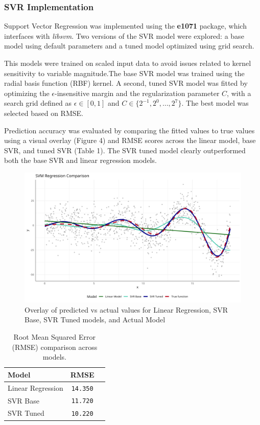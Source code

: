 \documentclass[8pt,twocolumn]{article}
\begin{document}
\subsubsection{SVR Implementation}
Support Vector Regression was implemented using the \textbf{e1071} package, which interfaces with \textit{libsvm}. Two versions of the SVR model were explored: a base model using default parameters and a tuned model optimized using grid search.

This models were trained on scaled input data to avoid issues related to kernel sensitivity to variable magnitude.The base SVR model was trained using the radial basis function (RBF) kernel. A second, tuned SVR model was fitted by optimizing the $\epsilon$-insensitive margin and the regularization parameter $C$, with a search grid defined as $\epsilon \in [0, 1]$ and $C \in \{2^{-1}, 2^0, \dots, 2^7\}$. The best model was selected based on RMSE. 

Prediction accuracy was evaluated by comparing the fitted values to true values using a visual overlay (Figure 4) and RMSE scores across the linear model, base SVR, and tuned SVR (Table 1). The SVR tuned model clearly outperformed both the base SVR and linear regression models.

\begin{figure}[htbp]
    \centering
    \includegraphics[width=0.8\columnwidth]{img4.png}
    \caption{Overlay of predicted vs actual values for Linear Regression, SVR Base, SVR Tuned models, and Actual Model}
    \label{fig:svr_overlay}
    \vspace{-10pt}
\end{figure}

\begin{table}[htbp]
    \centering
    \begin{tabular}{lcc}
    \hline
    \textbf{Model} & \textbf{RMSE} \\
    \hline
    Linear Regression & \texttt{14.350} \\
    SVR Base          & \texttt{11.720} \\
    SVR Tuned         & \texttt{10.220} \\
    \hline
    \end{tabular}
    \caption{Root Mean Squared Error (RMSE) comparison across models.}
    \label{tab:svr_rmse}
\end{table}
\end{document}
